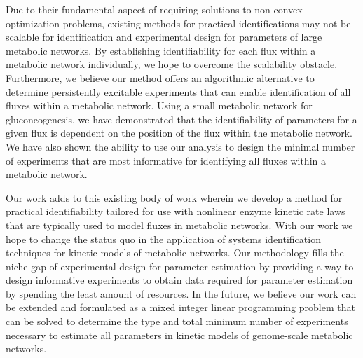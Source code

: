 \documentclass[10pt]{article}
\begin{document}
Due to their fundamental aspect of requiring solutions to non-convex optimization problems, existing methods for practical identifications may not be scalable for identification and experimental design for parameters of large metabolic networks. By establishing identifiability for each flux within a metabolic network individually, we hope to overcome the scalability obstacle. Furthermore, we believe our method offers an algorithmic alternative to determine persistently excitable experiments that can enable identification of all fluxes within a metabolic network. Using a small metabolic network for gluconeogenesis, we have demonstrated that the identifiability of parameters for a given flux is dependent on the position of the flux within the metabolic network. We have also shown the ability to use our analysis to design the minimal number of experiments that are most informative for identifying all fluxes within a metabolic network.

Our work adds to this existing body of work wherein we develop a method for practical identifiability tailored for use with nonlinear enzyme kinetic rate laws that are typically used to model fluxes in metabolic networks. With our work we hope to change the status quo in the application of systems identification techniques for kinetic models of metabolic networks. Our methodology fills the niche gap of experimental design for parameter estimation by providing a way to design informative experiments to obtain data required for parameter estimation by spending the least amount of resources.	
In the future, we believe our work can be extended and formulated as a mixed integer linear programming problem that can be solved to determine the type and total minimum number of experiments necessary to estimate all parameters in kinetic models of genome-scale metabolic networks.

\end{document}
